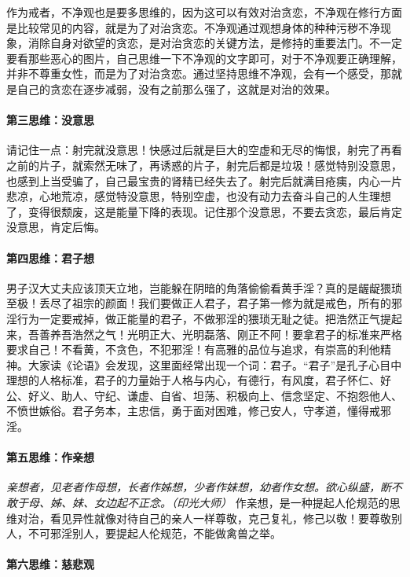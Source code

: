 作为戒者，不净观也是要多思维的，因为这可以有效对治贪恋，不净观在修行方面是比较常见的内容，就是为了对治贪恋。不净观通过观想身体的种种污秽不净现象，消除自身对欲望的贪恋，是对治贪恋的关键方法，是修持的重要法门。不一定要看那些恶心的图片，自己思维一下不净观的文字即可，对于不净观要正确理解，并非不尊重女性，而是为了对治贪恋。通过坚持思维不净观，会有一个感受，那就是自己的贪恋在逐步减弱，没有之前那么强了，这就是对治的效果。

\paragraph{第三思维：没意思}

请记住一点：射完就没意思！快感过后就是巨大的空虚和无尽的悔恨，射完了再看之前的片子，就索然无味了，再诱惑的片子，射完后都是垃圾！感觉特别没意思，也感到上当受骗了，自己最宝贵的肾精已经失去了。射完后就满目疮痍，内心一片悲凉，心地荒凉，感觉特没意思，特别空虚，也没有动力去奋斗自己的人生理想了，变得很颓废，这是能量下降的表现。记住那个没意思，不要去贪恋，最后肯定没意思，肯定后悔。

\paragraph{第四思维：君子想}

男子汉大丈夫应该顶天立地，岂能躲在阴暗的角落偷偷看黄手淫？真的是龌龊猥琐至极！丢尽了祖宗的颜面！我们要做正人君子，君子第一修为就是戒色，所有的邪淫行为一定要戒掉，做正能量的君子，不做邪淫的猥琐无耻之徒。把浩然正气提起来，吾善养吾浩然之气！光明正大、光明磊落、刚正不阿！要拿君子的标准来严格要求自己！不看黄，不贪色，不犯邪淫！有高雅的品位与追求，有崇高的利他精神。大家读《论语》会发现，这里面经常出现一个词：君子。“君子”是孔子心目中理想的人格标准，君子的力量始于人格与内心，有德行，有风度，君子怀仁、好公、好义、助人、守纪、谦虚、自省、坦荡、积极向上、信念坚定、不抱怨他人、不愤世嫉俗。君子务本，主忠信，勇于面对困难，修己安人，守孝道，懂得戒邪淫。

\paragraph{第五思维：作亲想}

\textit{亲想者，见老者作母想，长者作姊想，少者作妹想，幼者作女想。欲心纵盛，断不敢于母、姊、妹、女边起不正念。（印光大师）} 作亲想，是一种提起人伦规范的思维对治，看见异性就像对待自己的亲人一样尊敬，克己复礼，修己以敬！要尊敬别人，不可邪淫别人，要提起人伦规范，不能做禽兽之举。

\paragraph{第六思维：慈悲观}

